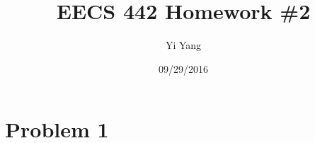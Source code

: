 \documentclass[letterpaper]{article}
\author{Yi Yang}
\title{EECS 442 Homework \#2}
\begin{document}
\date{09/29/2016}
\maketitle

\newcommand{\trace}{\mathrm{trace}}
\newcommand{\real}{\mathbb R}  %
\newcommand{\nat}{\mathbb N}   %
\newcommand{\cp}{\mathbb C}    %
\newcommand{\ds}{\displaystyle}
\newcommand{\mf}[2]{\frac{\ds #1}{\ds #2}}
\newcommand{\spanof}[1]{\textrm{span} \{ #1 \}}
\newcommand{\sol}[0]{\textbf{Solution: }}
\newcommand{\pf}[0]{\textbf{Proof:}}
\newcommand{\rme}[0]{\textrm{e}}
\newcommand{\Null}[1]{\textrm{Null}\{#1\}}
\parindent 0pt
\section*{Problem 1}
\end{document}
